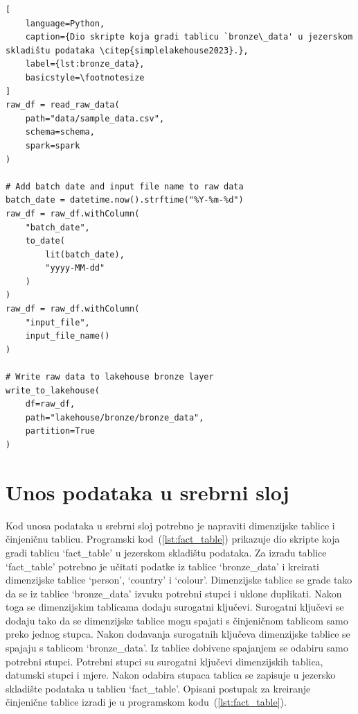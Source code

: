 \begin{lstlisting}[
    language=Python, 
    caption={Dio skripte koja gradi tablicu `bronze\_data' u jezerskom skladištu podataka \citep{simplelakehouse2023}.}, 
    label={lst:bronze_data},
    basicstyle=\footnotesize
]
raw_df = read_raw_data(
    path="data/sample_data.csv",
    schema=schema,
    spark=spark
)

# Add batch date and input file name to raw data
batch_date = datetime.now().strftime("%Y-%m-%d")
raw_df = raw_df.withColumn(
    "batch_date",
    to_date(
        lit(batch_date),
        "yyyy-MM-dd"
    )
)
raw_df = raw_df.withColumn(
    "input_file",
    input_file_name()
)

# Write raw data to lakehouse bronze layer
write_to_lakehouse(
    df=raw_df,
    path="lakehouse/bronze/bronze_data",
    partition=True
)
\end{lstlisting}

\section{Unos podataka u srebrni sloj} \label{section:unos_podataka_u_srebrni_sloj}

Kod unosa podataka u srebrni sloj potrebno je napraviti dimenzijske tablice i 
činjeničnu tablicu. Programski kod~(\ref{lst:fact_table}) prikazuje dio
skripte koja gradi tablicu `fact\_table' u jezerskom skladištu podataka. Za
izradu tablice `fact\_table' potrebno je učitati podatke iz tablice
`bronze\_data' i kreirati dimenzijske tablice `person', `country' i `colour'. 
Dimenzijske tablice se grade tako da se iz tablice `bronze\_data' izvuku
potrebni stupci i uklone duplikati. Nakon toga se dimenzijskim tablicama dodaju
surogatni ključevi. Surogatni ključevi se dodaju tako da se dimenzijske tablice
mogu spajati s činjeničnom tablicom samo preko jednog stupca. Nakon dodavanja
surogatnih ključeva dimenzijske tablice se spajaju s tablicom `bronze\_data'. 
Iz tablice dobivene spajanjem se odabiru samo potrebni stupci. Potrebni stupci
su surogatni ključevi dimenzijskih tablica, datumski stupci i mjere. Nakon
odabira stupaca tablica se zapisuje u jezersko skladište podataka u tablicu
`fact\_table'. Opisani postupak za kreiranje činjenične tablice izradi je u
programskom kodu~(\ref{lst:fact_table}). 

